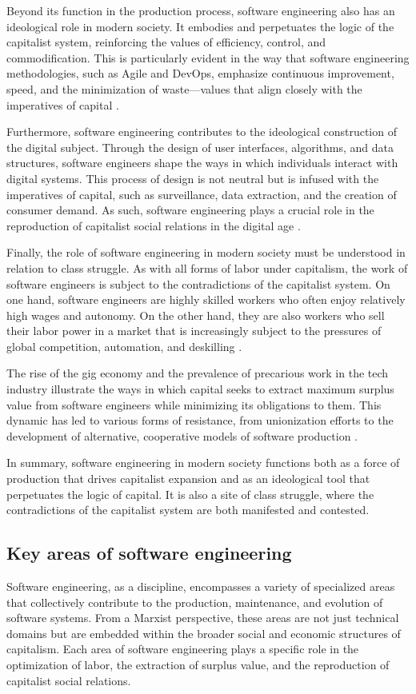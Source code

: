 \begin{refsection}
\begin{multicols}{2}
{Beyond its function in the production process, software engineering also has an ideological role in modern society. It embodies and perpetuates the logic of the capitalist system, reinforcing the values of efficiency, control, and commodification. This is particularly evident in the way that software engineering methodologies, such as Agile and DevOps, emphasize continuous improvement, speed, and the minimization of waste—values that align closely with the imperatives of capital \cite{braverman1974labor}.

Furthermore, software engineering contributes to the ideological construction of the digital subject. Through the design of user interfaces, algorithms, and data structures, software engineers shape the ways in which individuals interact with digital systems. This process of design is not neutral but is infused with the imperatives of capital, such as surveillance, data extraction, and the creation of consumer demand. As such, software engineering plays a crucial role in the reproduction of capitalist social relations in the digital age \cite{fuchs2014digital}.

Finally, the role of software engineering in modern society must be understood in relation to class struggle. As with all forms of labor under capitalism, the work of software engineers is subject to the contradictions of the capitalist system. On one hand, software engineers are highly skilled workers who often enjoy relatively high wages and autonomy. On the other hand, they are also workers who sell their labor power in a market that is increasingly subject to the pressures of global competition, automation, and deskilling \cite{fuchs2014digital}.

The rise of the gig economy and the prevalence of precarious work in the tech industry illustrate the ways in which capital seeks to extract maximum surplus value from software engineers while minimizing its obligations to them. This dynamic has led to various forms of resistance, from unionization efforts to the development of alternative, cooperative models of software production \cite{scholz2016platform}.

In summary, software engineering in modern society functions both as a force of production that drives capitalist expansion and as an ideological tool that perpetuates the logic of capital. It is also a site of class struggle, where the contradictions of the capitalist system are both manifested and contested.
}
\subsection{Key areas of software engineering}
{\small
Software engineering, as a discipline, encompasses a variety of specialized areas that collectively contribute to the production, maintenance, and evolution of software systems. From a Marxist perspective, these areas are not just technical domains but are embedded within the broader social and economic structures of capitalism. Each area of software engineering plays a specific role in the optimization of labor, the extraction of surplus value, and the reproduction of capitalist social relations.

}
\end{multicols}
\end{refsection}
